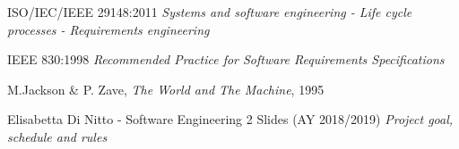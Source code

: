 \begin{thebibliography}{9}

	ISO/IEC/IEEE 29148:2011 \emph{Systems and software engineering - Life cycle processes - Requirements engineering}

	IEEE 830:1998 \emph{Recommended Practice for Software Requirements Specifications}

  M.Jackson \& P. Zave, \emph{The World and The Machine}, 1995

  Elisabetta Di Nitto - Software Engineering 2 Slides (AY 2018/2019) \emph{Project goal, schedule and rules}

\end{thebibliography}
